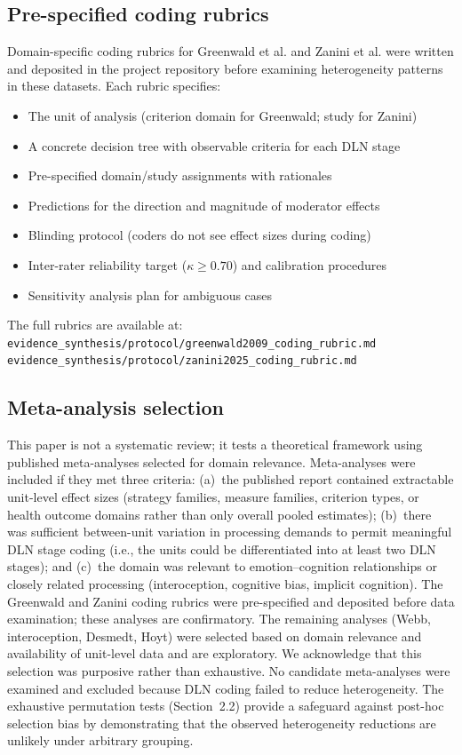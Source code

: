 \documentclass[11pt]{article}
\begin{document}
\subsection{Pre-specified coding rubrics}

Domain-specific coding rubrics for Greenwald et al.\cite{Greenwald2009}
and Zanini et al.\cite{Zanini2025} were written and deposited in the
project repository before examining heterogeneity patterns in these
datasets. Each rubric specifies:
\begin{itemize}[nosep]
\item The unit of analysis (criterion domain for Greenwald; study for
Zanini)
\item A concrete decision tree with observable criteria for each DLN
stage
\item Pre-specified domain/study assignments with rationales
\item Predictions for the direction and magnitude of moderator effects
\item Blinding protocol (coders do not see effect sizes during coding)
\item Inter-rater reliability target ($\kappa \geq 0.70$) and
calibration procedures
\item Sensitivity analysis plan for ambiguous cases
\end{itemize}

The full rubrics are available at:\\
\texttt{evidence\_synthesis/protocol/greenwald2009\_coding\_rubric.md}\\
\texttt{evidence\_synthesis/protocol/zanini2025\_coding\_rubric.md}


\subsection{Meta-analysis selection}

This paper is not a systematic review; it tests a theoretical
framework using published meta-analyses selected for domain relevance.
Meta-analyses were included if they met three criteria: (a)~the
published report contained extractable unit-level effect sizes
(strategy families, measure families, criterion types,
or health outcome domains rather than only overall pooled estimates);
(b)~there was sufficient between-unit variation in processing demands
to permit meaningful DLN stage coding (i.e., the units could be
differentiated into at least two DLN stages); and (c)~the domain was
relevant to emotion--cognition relationships or closely related
processing (interoception, cognitive bias, implicit cognition).
The Greenwald and Zanini coding rubrics were pre-specified and
deposited before data examination; these analyses are confirmatory.
The remaining analyses (Webb, interoception, Desmedt, Hoyt) were
selected based on domain relevance and availability of unit-level
data and are exploratory. We acknowledge that this selection was
purposive rather than exhaustive. No candidate meta-analyses were
examined and excluded because DLN coding failed to reduce
heterogeneity. The exhaustive permutation tests (Section~2.2)
provide a safeguard against post-hoc selection bias by demonstrating
that the observed heterogeneity reductions are unlikely under
arbitrary grouping.
\end{document}

